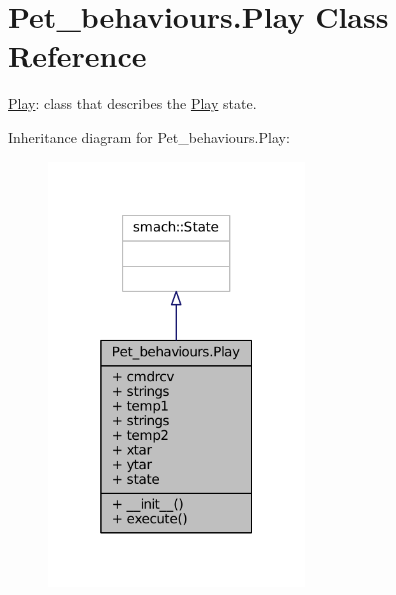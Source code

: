 \hypertarget{classPet__behaviours_1_1Play}{}\section{Pet\+\_\+behaviours.\+Play Class Reference}
\label{classPet__behaviours_1_1Play}


\hyperlink{classPet__behaviours_1_1Play}{Play}\+: class that describes the \hyperlink{classPet__behaviours_1_1Play}{Play} state.  




Inheritance diagram for Pet\+\_\+behaviours.\+Play\+:\nopagebreak
\begin{figure}[H]
\begin{center}
\leavevmode
\includegraphics[width=193pt]{classPet__behaviours_1_1Play__inherit__graph}
\end{center}
\end{figure}


